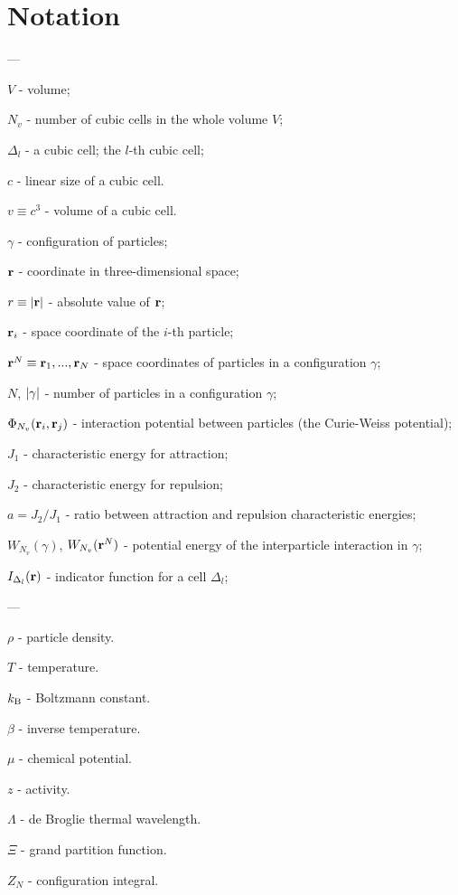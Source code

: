 \section{Notation}

---

$V$ - volume;

$N_v$ - number of cubic cells in the whole volume $V$;

$\Delta_{l}$ - a cubic cell; the $l$-th cubic cell;

$c$ - linear size of a cubic cell.

$v \equiv c^3$ - volume of a cubic cell.

$\gamma$ - configuration of particles;

$\vb r$ - coordinate in three-dimensional space;

$r \equiv \abs{\vb r}$ - absolute value of $\vb r$;

$\vb{r}_i$ - space coordinate of the $i$-th particle;

$\vb{r}^N \equiv \vb{r}_1, ..., \vb{r}_N$ - space coordinates of particles in a configuration $\gamma$;

$N$, $\abs{\gamma}$ - number of particles in a configuration $\gamma$;

$\Phi_{N_v}(\vb{r}_i, \vb{r}_j)$ - interaction potential between particles (the Curie-Weiss potential);

$J_1$ - characteristic energy for attraction;

$J_2$ - characteristic energy for repulsion;

$a=J_2/J_1$ - ratio between attraction and repulsion characteristic energies;

$W_{N_v}(\gamma)$, $W_{N_v}(\vb{r}^N)$ - potential energy of the interparticle interaction in $\gamma$;

$I_{\Delta_l} (\vb{r})$ - indicator function for a cell $\Delta_{l}$;

---

$\rho$ - particle density.

$T$ - temperature.

$k_{\rm B}$ - Boltzmann constant.

$\beta$ - inverse temperature.

$\mu$ - chemical potential.

$z$ - activity.

$\Lambda$ - de Broglie thermal wavelength.

$\Xi$ - grand partition function.

$Z_N$ - configuration integral.

